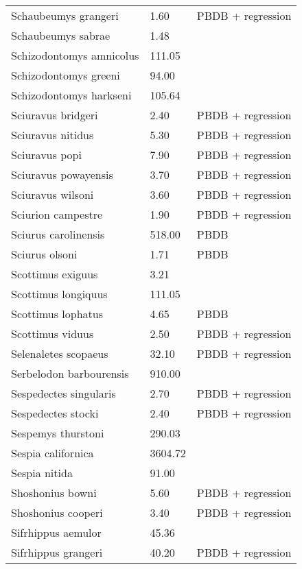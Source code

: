 \documentclass{article}
\begin{document}
\begin{center}
\begin{longtable}{p{} p{} p{}}
    Schaubeumys grangeri & 1.60 & PBDB + regression \\ 
    Schaubeumys sabrae & 1.48 & \cite{Matthew1901} \\ 
    Schizodontomys amnicolus & 111.05 & \cite{Tomiya2013} \\ 
    Schizodontomys greeni & 94.00 & \cite{McKenna2011} \\ 
    Schizodontomys harkseni & 105.64 & \cite{Tomiya2013} \\ 
    Sciuravus bridgeri & 2.40 & PBDB + regression \\ 
    Sciuravus nitidus & 5.30 & PBDB + regression \\ 
    Sciuravus popi & 7.90 & PBDB + regression \\ 
    Sciuravus powayensis & 3.70 & PBDB + regression \\ 
    Sciuravus wilsoni & 3.60 & PBDB + regression \\ 
    Sciurion campestre & 1.90 & PBDB + regression \\ 
    Sciurus carolinensis & 518.00 & PBDB \\ 
    Sciurus olsoni & 1.71 & PBDB \\ 
    Scottimus exiguus & 3.21 & \cite{Novacek1977} \\ 
    Scottimus longiquus & 111.05 & \cite{Tomiya2013} \\ 
    Scottimus lophatus & 4.65 & PBDB \\ 
    Scottimus viduus & 2.50 & PBDB + regression \\ 
    Selenaletes scopaeus & 32.10 & PBDB + regression \\ 
    Serbelodon barbourensis & 910.00 & \cite{Secord2008a} \\ 
    Sespedectes singularis & 2.70 & PBDB + regression \\ 
    Sespedectes stocki & 2.40 & PBDB + regression \\ 
    Sespemys thurstoni & 290.03 & \cite{Tomiya2013} \\ 
    Sespia californica & 3604.72 & \cite{Tomiya2013} \\ 
    Sespia nitida & 91.00 & \cite{VanValkenburgh2007a} \\ 
    Shoshonius bowni & 5.60 & PBDB + regression \\ 
    Shoshonius cooperi & 3.40 & PBDB + regression \\ 
    Sifrhippus aemulor & 45.36 & \cite{Osborn1933} \\ 
    Sifrhippus grangeri & 40.20 & PBDB + regression \\ 

\end{longtable}
\end{center}
\end{document}
